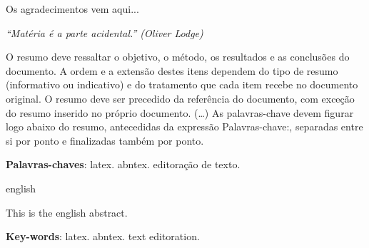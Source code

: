 \documentclass[
	12pt,				%
	openright,			%
	twoside,			%
	a4paper,			%
	english,			%
	brazil				%
	]{abntex2}
\begin{document}

%




\begin{agradecimentos}
\noindent Os agradecimentos vem aqui...

\end{agradecimentos}

\begin{epigrafe}
    \vspace*{\fill}
	\begin{flushright}
		\textit{``Matéria é a parte acidental.'' (Oliver Lodge)}
	\end{flushright}
\end{epigrafe}


\setlength{\absparsep}{18pt} %
\begin{resumo}
 \noindent O resumo deve ressaltar o objetivo, o método, os resultados e as conclusões do documento. A ordem e a extensão
 destes itens dependem do tipo de resumo (informativo ou indicativo) e do tratamento que cada item recebe no documento original. O resumo deve ser precedido da referência do documento, com exceção do resumo inserido no
 próprio documento. (\ldots) As palavras-chave devem figurar logo abaixo do resumo, antecedidas da expressão Palavras-chave:, separadas entre si por
 ponto e finalizadas também por ponto.

 \textbf{Palavras-chaves}: latex. abntex. editoração de texto.
\end{resumo}

\begin{resumo}[Abstract]
 \begin{otherlanguage*}{english}

\noindent This is the english abstract.

   \vspace{\onelineskip}

   \noindent
   \textbf{Key-words}: latex. abntex. text editoration.
 \end{otherlanguage*}
\end{resumo}
\end{document}
